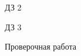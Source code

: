 \begin{homework}[number=2]
	\begin{listofex}
		\item ДЗ 2
	\end{listofex}
\end{homework}

\begin{homework}[number=3]
	\begin{listofex}
		\item ДЗ 3
	\end{listofex}
\end{homework}

\begin{exam}
	\begin{listofex}
		\item Проверочная работа
	\end{listofex}
\end{exam}
